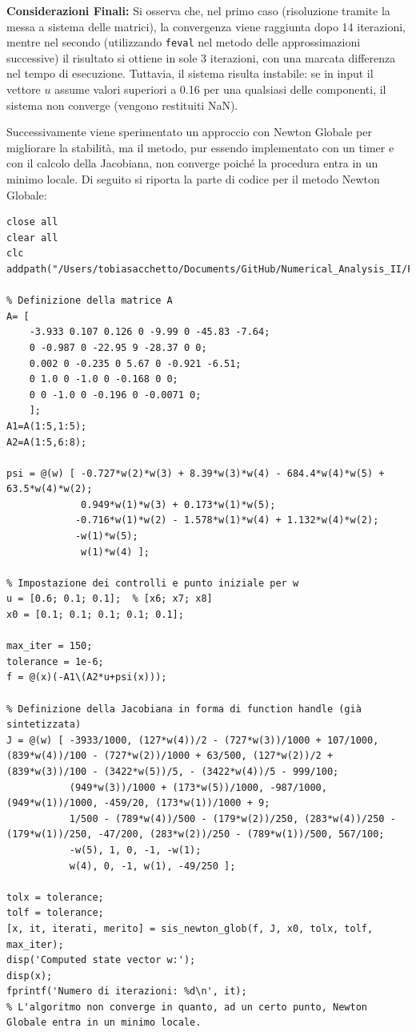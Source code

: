 \documentclass[11pt]{article}
\begin{document}
\vspace{1em}
\textbf{Considerazioni Finali:}  
Si osserva che, nel primo caso (risoluzione tramite la messa a sistema delle matrici), la convergenza viene raggiunta dopo 14 iterazioni, mentre nel secondo (utilizzando \texttt{feval} nel metodo delle approssimazioni successive) il risultato si ottiene in sole 3 iterazioni, con una marcata differenza nel tempo di esecuzione. Tuttavia, il sistema risulta instabile: se in input il vettore \(u\) assume valori superiori a 0.16 per una qualsiasi delle componenti, il sistema non converge (vengono restituiti NaN).

\vspace{1em}
Successivamente viene sperimentato un approccio con Newton Globale per migliorare la stabilità, ma il metodo, pur essendo implementato con un timer e con il calcolo della Jacobiana, non converge poiché la procedura entra in un minimo locale. Di seguito si riporta la parte di codice per il metodo Newton Globale:

\begin{lstlisting}
close all
clear all
clc
addpath("/Users/tobiasacchetto/Documents/GitHub/Numerical_Analysis_II/Function");

% Definizione della matrice A
A= [
    -3.933 0.107 0.126 0 -9.99 0 -45.83 -7.64;
    0 -0.987 0 -22.95 9 -28.37 0 0;
    0.002 0 -0.235 0 5.67 0 -0.921 -6.51;
    0 1.0 0 -1.0 0 -0.168 0 0;
    0 0 -1.0 0 -0.196 0 -0.0071 0;
    ];
A1=A(1:5,1:5);
A2=A(1:5,6:8);

psi = @(w) [ -0.727*w(2)*w(3) + 8.39*w(3)*w(4) - 684.4*w(4)*w(5) + 63.5*w(4)*w(2);
             0.949*w(1)*w(3) + 0.173*w(1)*w(5);
            -0.716*w(1)*w(2) - 1.578*w(1)*w(4) + 1.132*w(4)*w(2);
            -w(1)*w(5);
             w(1)*w(4) ]; 

% Impostazione dei controlli e punto iniziale per w
u = [0.6; 0.1; 0.1];  % [x6; x7; x8]
x0 = [0.1; 0.1; 0.1; 0.1; 0.1];

max_iter = 150;
tolerance = 1e-6;
f = @(x)(-A1\(A2*u+psi(x)));

% Definizione della Jacobiana in forma di function handle (già sintetizzata)
J = @(w) [ -3933/1000, (127*w(4))/2 - (727*w(3))/1000 + 107/1000, (839*w(4))/100 - (727*w(2))/1000 + 63/500, (127*w(2))/2 + (839*w(3))/100 - (3422*w(5))/5, - (3422*w(4))/5 - 999/100;
           (949*w(3))/1000 + (173*w(5))/1000, -987/1000, (949*w(1))/1000, -459/20, (173*w(1))/1000 + 9;
           1/500 - (789*w(4))/500 - (179*w(2))/250, (283*w(4))/250 - (179*w(1))/250, -47/200, (283*w(2))/250 - (789*w(1))/500, 567/100;
           -w(5), 1, 0, -1, -w(1);
           w(4), 0, -1, w(1), -49/250 ];

tolx = tolerance;
tolf = tolerance;
[x, it, iterati, merito] = sis_newton_glob(f, J, x0, tolx, tolf, max_iter);
disp('Computed state vector w:');
disp(x);
fprintf('Numero di iterazioni: %d\n', it);
% L'algoritmo non converge in quanto, ad un certo punto, Newton Globale entra in un minimo locale.
\end{lstlisting}
\end{document}
